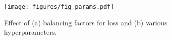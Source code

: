 \begin{figure}[t]
	\centering
    \texttt{[image: figures/fig\_params.pdf]}
    \vspace{-0.7em}
    \caption{Effect of (a) balancing factors for loss and (b) various hyperparameters.}
    \label{fig:hyperparams}
\end{figure}